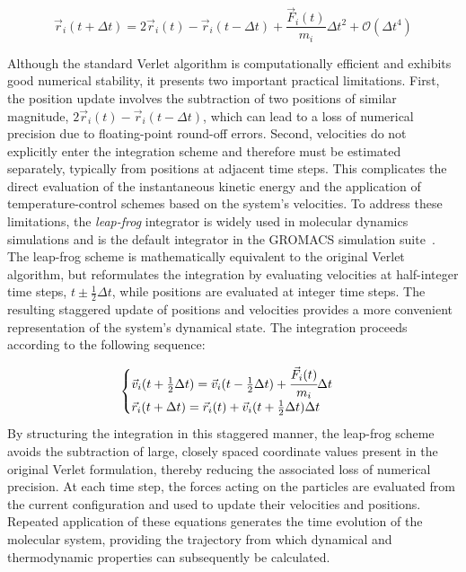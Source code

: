 \begin{equation}\label{eq:verlet}
    \vec{r}_i(t + \Delta t) = 2\vec{r}_i(t) - \vec{r}_i(t - \Delta t) + \frac{\vec{F}_i(t)}{m_i}\Delta t^2 + \mathcal{O}(\Delta t^4)
\end{equation}

Although the standard Verlet algorithm is computationally efficient and exhibits good numerical stability, it presents two important practical limitations. First, the position update involves the subtraction of two positions of similar magnitude, $2\vec{r}_i(t)-\vec{r}_i(t-\Delta t)$, which can lead to a loss of numerical precision due to floating-point round-off errors. Second, velocities do not explicitly enter the integration scheme and therefore must be estimated separately, typically from positions at adjacent time steps. This complicates the direct evaluation of the instantaneous kinetic energy and the application of temperature-control schemes based on the system's velocities.
To address these limitations, the \textit{leap-frog} integrator is widely used in molecular dynamics simulations and is the default integrator in the GROMACS simulation suite~\cite{leapfrog}. The leap-frog scheme is mathematically equivalent to the original Verlet algorithm, but reformulates the integration by evaluating velocities at half-integer time steps, $t\pm\frac{1}{2}\Delta t$, while positions are evaluated at integer time steps. The resulting staggered update of positions and velocities provides a more convenient representation of the system's dynamical state. The integration proceeds according to the following sequence:

\begin{equation}\label{eq:leapfrog}
    \begin{cases}
        \vec{v}_i(t+\frac{1}{2}\Delta t) = \vec{v}_i(t-\frac{1}{2}\Delta t) + \cfrac{\vec{F}_i(t)}{m_i} \Delta t \\
        \vec{r}_i(t+\Delta t) = \vec{r}_i(t) + \vec{v}_i(t+\frac{1}{2}\Delta t) \Delta t
    \end{cases}
\end{equation}
By structuring the integration in this staggered manner, the leap-frog scheme avoids the subtraction of large, closely spaced coordinate values present in the original Verlet formulation, thereby reducing the associated loss of numerical precision. At each time step, the forces acting on the particles are evaluated from the current configuration and used to update their velocities and positions. Repeated application of these equations generates the time evolution of the molecular system, providing the trajectory from which dynamical and thermodynamic properties can subsequently be calculated.

